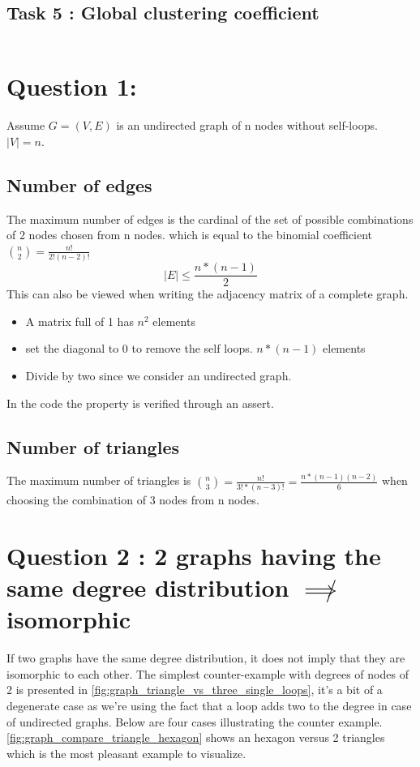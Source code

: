 \documentclass[a4paper]{article}
\begin{document}
\subsection*{Task 5 : Global clustering coefficient}
\begin{verbatim}
\end{verbatim}


\section{Question 1:}
Assume $G = (V, E)$ is an undirected graph of n nodes without self-loops. $|V|=n$.
\subsection*{Number of edges}
The maximum number of edges is the cardinal of the set of possible combinations of 2 nodes chosen from n nodes.
which is equal to the binomial coefficient $\binom{n}{2} = \frac{n!}{2! (n-2)!}$
\begin{equation}\label{eq 1.1}
|E| \leq \frac{n*(n-1)}{2}
\end{equation}
This can also be viewed when writing the adjacency matrix of a complete graph.
\begin{itemize}
    \item  A matrix full of 1 has $n^2$ elements
    \item set the diagonal to 0 to remove the self loops. $n*(n-1)$ elements
    \item Divide by two since we consider an undirected graph.
\end{itemize}


In the code the property is verified through an assert.

\subsection*{Number of triangles}
The maximum number of triangles is $\binom{n}{3} = \frac{n!}{3! * (n-3)!} = \frac{n*(n-1)(n-2)}{6}$ 
when choosing the combination of 3 nodes from n nodes.


\section{Question 2 : 2 graphs having the same degree distribution $\not \implies$ isomorphic}
If two graphs have the same degree distribution, it does not imply that they are isomorphic to each other.
The simplest counter-example with degrees of nodes of 2 is presented 
in \ref{fig:graph_triangle_vs_three_single_loops},
it's a bit of a degenerate case as we're using the fact that a loop adds two to the degree in case of undirected graphs.
Below are four cases illustrating the counter example.
\ref{fig:graph_compare_triangle_hexagon} shows an hexagon versus 2 triangles 
which is the most pleasant example to visualize.
\end{document}
